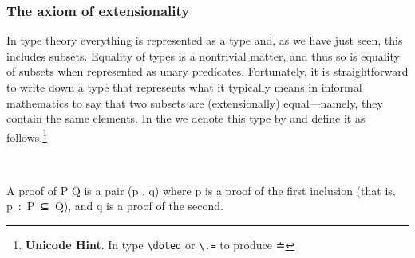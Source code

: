 \subsubsection{The axiom of extensionality}\label{sec:axiom-ext}
In type theory everything is represented as a type and, as we have just seen, this includes subsets.  Equality of types is a nontrivial matter, and thus so is equality of subsets when represented as unary predicates.  Fortunately, it is straightforward to write down a type that represents what it typically means in informal mathematics to say that two subsets are (extensionally) equal---namely, they contain the same elements. In the \ualib we denote this type by  and define it as follows.\footnote{%
\textbf{Unicode Hint}. In \agdamode type \texttt{\textbackslash{}doteq} or \texttt{\textbackslash{}.=} to produce ≐}
\ccpad
\begin{code}
\>[0]\AgdaSpace{}%
\AgdaSymbol{:}\AgdaSpace{}%
\AgdaSymbol{\{}\AgdaSpace{}%
\AgdaSpace{}%
\AgdaSpace{}%
\AgdaSymbol{:}\AgdaSpace{}%
\AgdaSymbol{\}\{}\AgdaSpace{}%
\AgdaSymbol{:}\AgdaSpace{}%
\AgdaSpace{}%
\AgdaSpace{}%
\AgdaSymbol{\}}\AgdaSpace{}%
\AgdaSpace{}%
\AgdaSpace{}%
\AgdaSpace{}%
\AgdaSpace{}%
\AgdaSpace{}%
\AgdaSpace{}%
\AgdaSpace{}%
\AgdaSpace{}%
\AgdaSpace{}%
\AgdaSpace{}%
\AgdaSpace{}%
\AgdaSpace{}%
\AgdaSpace{}%
\AgdaSpace{}%
\<%
\\
\>[0]\AgdaSpace{}%
\AgdaSpace{}%
\AgdaSpace{}%
\AgdaSymbol{=}\AgdaSpace{}%
\AgdaSymbol{(}\AgdaSpace{}%
\AgdaSpace{}%
\AgdaSymbol{)}\AgdaSpace{}%
\AgdaSpace{}%
\AgdaSymbol{(}\AgdaSpace{}%
\AgdaSpace{}%
\AgdaSymbol{)}\<%
\end{code}
\ccpad
A proof of \ab P  Q is a pair (\ab p , \ab q) where \ab p is a proof of the first inclusion (that is, \ab p~\as :~\ab P~\aof ⊆~\ab Q), and \ab q is a proof of the second.

